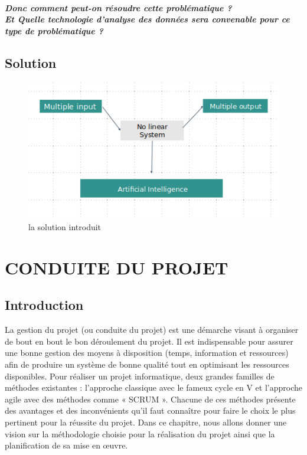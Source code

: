 \documentclass[11pt]{report}
\begin{document}
\paragraph{Donc comment peut-on résoudre cette problématique ?\\
Et Quelle technologie d’analyse des données sera convenable pour ce type de problématique ?
}
\section*{Solution}

\begin{figure}[H]
	\begin{center}
		\includegraphics[width=12cm]{images/solutions.png}
		\caption{la solution introduit}
		\label{fig:figure}
	\end{center}
\end{figure}


\chapter{CONDUITE DU PROJET}
\section{Introduction}
La gestion du projet (ou conduite du projet) est une démarche visant à organiser de bout en bout
le bon déroulement du projet. Il est indispensable pour assurer une bonne gestion des moyens à
disposition (temps, information et ressources) afin de produire un système de bonne qualité tout en
optimisant les ressources disponibles. Pour réaliser un projet informatique, deux grandes familles de
méthodes existantes : l’approche classique avec le fameux cycle en V et l’approche agile avec des
méthodes comme « SCRUM ». Chacune de ces méthodes présente des avantages et des
inconvénients qu’il faut connaître pour faire le choix le plus pertinent pour la réussite du projet.
Dans ce chapitre, nous allons donner une vision sur la méthodologie choisie pour la réalisation
du projet ainsi que la planification de sa mise en œuvre.
\end{document}
